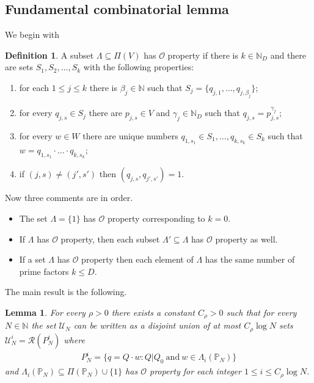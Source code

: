 \documentclass[a4paper,oneside]{amsart}
\theoremstyle{plain}
\newtheorem{lemma}[proposition]{Lemma}
\theoremstyle{definition}
\newtheorem{definition}{Definition}[section]
\numberwithin{equation}{section}
\theoremstyle{plain}
\newcommand{\NN}{\mathbb{N}}
\newcommand{\8}{\infty}
\begin{document}
\subsection{Fundamental combinatorial lemma} 
We begin with
\begin{definition}
\label{def:1}
A subset $\Lambda\subseteq \Pi(V)$ has
$\mathcal O$ property if there is $k\in\NN_D$ and there are sets 
$S_1, S_2,\ldots, S_k$ with the following properties:
\begin{enumerate}
\item[(i)] for each $1\le j\le k$ there is $
  \beta_j\in\NN$ such that $S_j=\{q_{j, 1},\ldots, q_{j, \beta_j}\}$;
\item[(ii)] for every $q_{j, s}\in S_j$ there are $p_{j, s}\in V$ and
  $\gamma_j\in\NN_D$ such that $q_{j, s}=p_{j, s}^{\gamma_j}$;
\item[(iii)] for every $w\in W$ there are unique numbers $q_{1, s_1}\in
  S_1,\ldots, q_{k, s_k}\in S_k$ such that $w=q_{1,
    s_1}\cdot\ldots\cdot q_{k, s_k}$;
\item[(iv)] if $(j, s)\not=(j', s')$ then $(q_{j, s}, q_{j', s'})=1$. 
\end{enumerate}  
\end{definition}
Now three comments are in order. 
\begin{itemize}
\item[(i)] The set $\Lambda=\{1\}$ has $\mathcal O$ property
corresponding to $k=0$.
\item[(ii)] If $\Lambda$ has $\mathcal O$ property,
then each subset $\Lambda'\subseteq \Lambda$ has $\mathcal O$ property as
well. 
\item[(iii)] 
  If a set $\Lambda$ has
$\mathcal O$ property then each element of $\Lambda$ has the same number of
prime factors $k\le D$.
\end{itemize}
The main result is the following.
\begin{lemma}
\label{lem:12}
For every $\rho>0$ there exists a constant $C_{\rho}>0$ such that for
every $N\in\NN$ the set $\mathscr{U}_N$ can be written as a
disjoint union of at most $C_{\rho}\log N$ sets
$\mathscr{U}_N^i=\mathcal R(P_N^i)$ where
\begin{align}
  \label{eq:14}
   P_N^i =\big\{
  q=Q\cdot w: Q|Q_0\ \text{and}\ w\in {\Lambda}_i(\mathbb P_N)\big\}
\end{align}
and 
${\Lambda}_i(\mathbb P_N)
\subseteq \Pi(\mathbb P_N)\cup\{1\}$ has $\mathcal O$ property
for each integer $1\le i\le C_{\rho}\log N$. 
\end{lemma}
\end{document}

